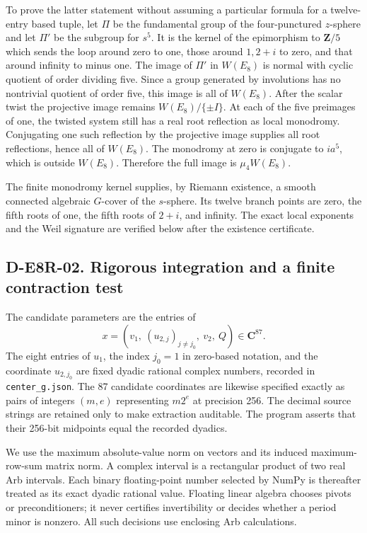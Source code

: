 To prove the latter statement without assuming a particular formula
for a twelve-entry based tuple, let $\Pi$ be the fundamental group
of the four-punctured $z$-sphere and let $\Pi'$ be the subgroup for
$s^5$. It is the kernel of the epimorphism to $\mathbf Z/5$ which
sends the loop around zero to one, those around $1,2+i$ to zero, and
that around infinity to minus one. The image of $\Pi'$ in $W(E_8)$
is normal with cyclic quotient of order dividing five. Since a group
generated by involutions has no nontrivial quotient of order five,
this image is all of $W(E_8)$. After the scalar twist the projective
image remains $W(E_8)/\{\pm I\}$. At each of the five preimages of
one, the twisted system still has a real root reflection as local
monodromy. Conjugating one such reflection by the projective image
supplies all root reflections, hence all of $W(E_8)$. The monodromy
at zero is conjugate to $ia^5$, which is outside $W(E_8)$. Therefore
the full image is $\mu_4W(E_8)$.

The finite monodromy kernel supplies, by Riemann existence, a smooth
connected algebraic $G$-cover of the $s$-sphere. Its twelve branch
points are zero, the fifth roots of one, the fifth roots of $2+i$,
and infinity. The exact local exponents and the Weil signature are
verified below after the existence certificate.

\subsection*{D-E8R-02. Rigorous integration and a finite contraction test}
The candidate parameters are the entries of
\[
x=(v_1,\ (u_{2,j})_{j\ne j_0},\ v_2,\ Q)\in\mathbf C^{87}.
\]
The eight entries of $u_1$, the index $j_0=1$ in zero-based notation,
and the coordinate $u_{2,j_0}$ are fixed dyadic rational complex
numbers, recorded in \texttt{center\_g.json}. The 87 candidate
coordinates are likewise specified exactly as pairs of integers
$(m,e)$ representing $m2^e$ at precision 256. The decimal source
strings are retained only to make extraction auditable. The program
asserts that their 256-bit midpoints equal the recorded dyadics.

We use the maximum absolute-value norm on vectors and its induced
maximum-row-sum matrix norm. A complex interval is a rectangular
product of two real Arb intervals. Each binary floating-point number
selected by NumPy is thereafter treated as its exact dyadic rational
value. Floating linear algebra chooses pivots or preconditioners;
it never certifies invertibility or decides whether a period minor
is nonzero. All such decisions use enclosing Arb calculations.

